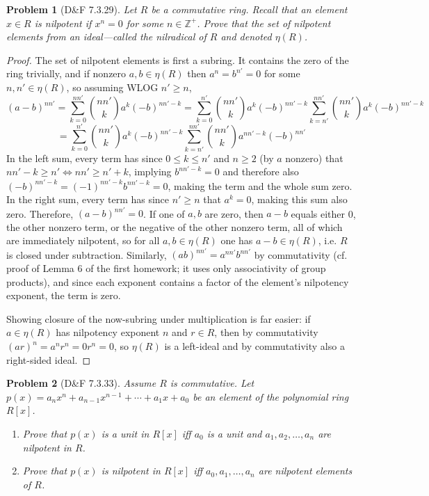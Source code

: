 \documentclass{article}
\newtheorem{plm}{Problem}
\begin{document}
\begin{plm}[D\&F 7.3.29]
  Let $R$ be a commutative ring.
  Recall that an element $x \in R$ is nilpotent if $x^{n} = 0$ for some $n \in \mathbb{Z}^{+}$.
  Prove that the set of nilpotent elements from an ideal---called the nilradical of $R$ and denoted $\eta(R)$.
\end{plm}

\begin{proof}
  The set of nilpotent elements is first a subring.
  It contains the zero of the ring trivially, and if nonzero $a, b \in \eta(R)$ then $a^{n} = b^{n'} = 0$ for some $n, n' \in \eta(R)$,
  so assuming WLOG $n' \geq n$,
  \[
    (a - b)^{nn'} = \sum_{k=0}^{nn'}\binom{nn'}{k}a^{k}(-b)^{nn' - k}
    = \sum_{k = 0}^{n'}\binom{nn'}{k}a^{k}(-b)^{nn'-k}\sum_{k = n'}^{nn'}\binom{nn'}{k}a^{k}(-b)^{nn' - k}
  \]
  \[
    = \sum_{k = 0}^{n'}\binom{nn'}{k}a^{k}(-b)^{nn'-k}\sum_{k = n'}^{nn'}\binom{nn'}{k}a^{nn' - k}(-b)^{nn'}
  \]
  In the left sum, every term has since $0 \leq k \leq n'$ and $n \geq 2$ (by $a$ nonzero) that $nn' - k \geq n' \Leftrightarrow nn' \geq n' + k$,
  implying $b^{nn' - k} = 0$ and therefore also $(-b)^{nn' - k} = (-1)^{nn' - k}b^{nn' - k} = 0$, making the term and the whole sum zero.
  In the right sum, every term has since $n' \geq n$ that $a^{k} = 0$, making this sum also zero.
  Therefore, $(a - b)^{nn'} = 0$.
  If one of $a, b$ are zero, then $a - b$ equals either 0, the other nonzero term, or the negative of the other nonzero term,
  all of which are immediately nilpotent, so for all $a, b \in \eta(R)$ one has $a - b \in \eta(R)$, i.e. $R$ is closed under subtraction.
  Similarly, $(ab)^{nn'} = a^{nn'}b^{nn'}$ by commutativity (cf. proof of Lemma 6 of the first homework; it uses only associativity of group products),
  and since each exponent contains a factor of the element's nilpotency exponent, the term is zero.

  Showing closure of the now-subring under multiplication is far easier: if $a \in \eta(R)$ has nilpotency exponent $n$ and $r \in R$,
  then by commutativity $(ar)^{n} = a^{n}r^{n} = 0r^{n} = 0$, so $\eta(R)$ is a left-ideal and by commutativity also a right-sided ideal.
\end{proof}



\begin{plm}[D\&F 7.3.33]
  Assume $R$ is commutative.
  Let $p(x) = a_{n}x^{n} + a_{n-1}x^{n-1} + \cdots + a_{1}x + a_{0}$ be an element of the polynomial ring $R[x]$.
  \begin{enumerate}
  \item Prove that $p(x)$ is a unit in $R[x]$ iff $a_{0}$ is a unit and $a_{1}, a_{2}, \ldots, a_{n}$ are nilpotent in $R$.
  \item Prove that $p(x)$ is nilpotent in $R[x]$ iff $a_{0}, a_{1}, \ldots, a_{n}$ are nilpotent elements of $R$.
  \end{enumerate}
\end{plm}
\end{document}
